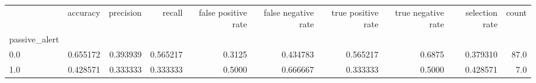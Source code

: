 \begin{tabular}{lrrrrrrrrr}
\toprule
{} &  accuracy &  precision &    recall &  false positive rate &  false negative rate &  true positive rate &  true negative rate &  selection rate &  count \\
passive\_alert &           &            &           &                      &                      &                     &                     &                 &        \\
\midrule
0.0           &  0.655172 &   0.393939 &  0.565217 &               0.3125 &             0.434783 &            0.565217 &              0.6875 &        0.379310 &   87.0 \\
1.0           &  0.428571 &   0.333333 &  0.333333 &               0.5000 &             0.666667 &            0.333333 &              0.5000 &        0.428571 &    7.0 \\
\bottomrule
\end{tabular}
